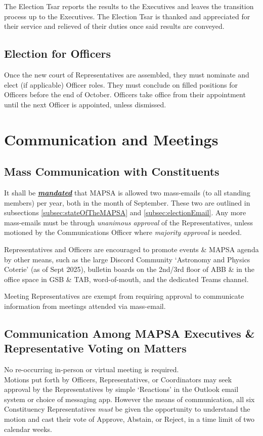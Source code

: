 \documentclass[8pt]{article}
\begin{document}
	The Election Tsar reports the results to the Executives and leaves the transition process up to the Executives. The Election Tsar is thanked and appreciated for their service and relieved of their duties once said results are conveyed.
	
	\subsection{Election for Officers}
	Once the new court of Representatives are assembled, they must nominate and elect (if applicable) Officer roles. They must conclude on filled positions for Officers before the end of October. Officers take office from their appointment until the next Officer is appointed, unless dismissed.
	
	\section{Communication and Meetings}
	\subsection{Mass Communication with Constituents}
	It shall be \textbf{\textit{\underline{mandated}}} that MAPSA is allowed two mass-emails (to all standing members) per year, both in the month of September. These two are outlined in subsections \ref{subsec:stateOfTheMAPSA} and \ref{subsec:electionEmail}. Any more mass-emails must be through \textit{unanimous approval} of the Representatives, unless motioned by the Communications Officer where \textit{majority approval} is needed.

	Representatives and Officers are encouraged to promote events \& MAPSA agenda by other means, such as the large Discord Community `Astronomy and Physics Coterie' (as of Sept 2025), bulletin boards on the 2nd/3rd floor of ABB \& in the office space in GSB \& TAB, word-of-mouth, and the dedicated Teams channel.
	
	Meeting Representatives are exempt from requiring approval to communicate information from meetings attended via mass-email.
	
	\subsection{Communication Among MAPSA Executives \& Representative Voting on Matters}
	No re-occurring in-person or virtual meeting is required. \\Motions put forth by Officers, Representatives, or Coordinators may seek approval by the Representatives by simple `Reactions' in the Outlook email system or choice of messaging app. However the means of communication, all six Constituency Representatives \textit{must} be given the opportunity to understand the motion and cast their vote of Approve, Abstain, or Reject, in a time limit of two calendar weeks.
	
\end{document}
